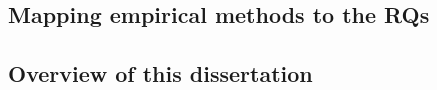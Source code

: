     
    


\subsection{Mapping empirical methods to the RQs}

\subsection{Overview of this dissertation}

